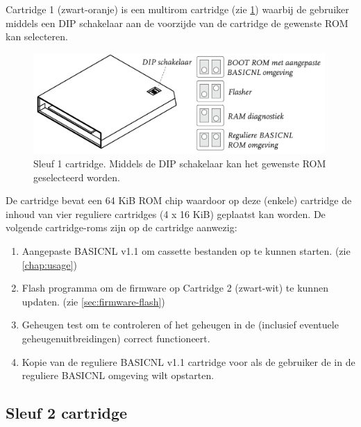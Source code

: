 
Cartridge 1 (zwart-oranje) is een  multirom cartridge (zie \cref{fig:cartridge-sleuf1}) waarbij de gebruiker middels een DIP schakelaar aan de voorzijde van de cartridge de gewenste ROM kan selecteren.

\begin{figure}[h!]
    \centering
    \includegraphics[width=0.99\textwidth]{img/slot1-cartridge.png}
    \caption{Sleuf 1 cartridge. Middels de DIP schakelaar kan het gewenste ROM geselecteerd worden.}
    \label{fig:cartridge-sleuf1}
\end{figure}

De cartridge bevat een 64 KiB ROM chip waardoor op deze (enkele) cartridge de inhoud van vier reguliere cartridges (4 x 16 KiB) geplaatst kan worden. De volgende cartridge-roms zijn op de  cartridge aanwezig:

\begin{enumerate}[noitemsep]
    \item Aangepaste BASICNL v1.1 om cassette bestanden op te kunnen starten. (zie \cref{chap:usage})
    \item Flash programma om de firmware op Cartridge 2 (zwart-wit) te kunnen updaten. (zie \cref{sec:firmware-flash})
    \item Geheugen test om te controleren of het geheugen in de  (inclusief eventuele geheugenuitbreidingen) correct functioneert.
    \item Kopie van de reguliere BASICNL v1.1 cartridge voor als de gebruiker de  in de reguliere BASICNL omgeving wilt opstarten.
\end{enumerate}


%
%
%
\subsection{Sleuf 2 cartridge}

